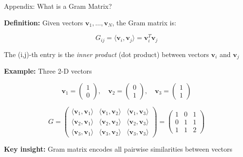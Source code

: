 \documentclass[aspectratio=169,11pt]{beamer}
\begin{document}
\begin{frame}{Appendix: What is a Gram Matrix?}

\textbf{Definition:} Given vectors $\mathbf{v}_1, \ldots, \mathbf{v}_N$, the Gram matrix is:

$$G_{ij} = \langle \mathbf{v}_i, \mathbf{v}_j \rangle = \mathbf{v}_i^T \mathbf{v}_j$$

The (i,j)-th entry is the \emph{inner product} (dot product) between vectors $\mathbf{v}_i$ and $\mathbf{v}_j$

\vspace{0.5em}

\textbf{Example:} Three 2-D vectors

$$\mathbf{v}_1 = \begin{pmatrix} 1 \\ 0 \end{pmatrix}, \quad \mathbf{v}_2 = \begin{pmatrix} 0 \\ 1 \end{pmatrix}, \quad \mathbf{v}_3 = \begin{pmatrix} 1 \\ 1 \end{pmatrix}$$

$$G = \begin{pmatrix}
\langle \mathbf{v}_1, \mathbf{v}_1 \rangle & \langle \mathbf{v}_1, \mathbf{v}_2 \rangle & \langle \mathbf{v}_1, \mathbf{v}_3 \rangle \\
\langle \mathbf{v}_2, \mathbf{v}_1 \rangle & \langle \mathbf{v}_2, \mathbf{v}_2 \rangle & \langle \mathbf{v}_2, \mathbf{v}_3 \rangle \\
\langle \mathbf{v}_3, \mathbf{v}_1 \rangle & \langle \mathbf{v}_3, \mathbf{v}_2 \rangle & \langle \mathbf{v}_3, \mathbf{v}_3 \rangle
\end{pmatrix} = \begin{pmatrix}
1 & 0 & 1 \\
0 & 1 & 1 \\
1 & 1 & 2
\end{pmatrix}$$

\vspace{0.3em}

\textbf{Key insight:} Gram matrix encodes all pairwise similarities between vectors

\end{frame}
\end{document}
